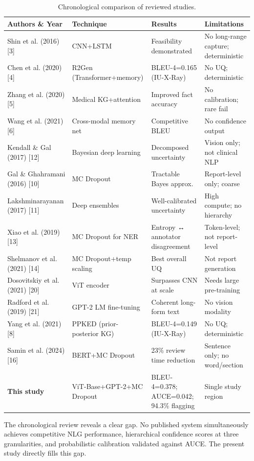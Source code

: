 \documentclass{jcst}
\begin{document}
\begin{table}[htbp]
\centering
\small
\caption{Chronological comparison of reviewed studies.}
\label{tab:lit_review}
\begin{tabular}{p{2.2cm}p{2.0cm}p{2.4cm}p{2.2cm}}
\toprule
\textbf{Authors \& Year} & \textbf{Technique} & \textbf{Results} & \textbf{Limitations} \\
\midrule
Shin et al. (2016) [3] & CNN+LSTM & Feasibility demonstrated & No long-range capture; deterministic \\
Chen et al. (2020) [4] & R2Gen (Transformer+memory) & BLEU-4=0.165 (IU-X-Ray) & No UQ; deterministic \\
Zhang et al. (2020) [5] & Medical KG+attention & Improved fact accuracy & No calibration; rare fail \\
Wang et al. (2021) [6] & Cross-modal memory net & Competitive BLEU & No confidence output \\
Kendall \& Gal (2017) [12] & Bayesian deep learning & Decomposed uncertainty & Vision only; not clinical NLP \\
Gal \& Ghahramani (2016) [10] & MC Dropout & Tractable Bayes approx. & Report-level only; coarse \\
Lakshminarayanan (2017) [11] & Deep ensembles & Well-calibrated uncertainty & High compute; no hierarchy \\
Xiao et al. (2019) [13] & MC Dropout for NER & Entropy ↔ annotator disagreement & Token-level; not report-level \\
Shelmanov et al. (2021) [14] & MC Dropout+temp scaling & Best overall UQ & Not report generation \\
Dosovitskiy et al. (2021) [20] & ViT encoder & Surpasses CNN at scale & Needs large pre-training \\
Radford et al. (2019) [21] & GPT-2 LM fine-tuning & Coherent long-form text & No vision modality \\
Yang et al. (2021) [8] & PPKED (prior-posterior KG) & BLEU-4=0.149 (IU-X-Ray) & No UQ; deterministic \\
Samin et al. (2024) [16] & BERT+MC Dropout & 23\% review time reduction & Sentence only; no word/section \\
\textbf{This study} & ViT-Base+GPT-2+MC Dropout & BLEU-4=0.378; AUCE=0.042; 94.3\% flagging & Single study region \\
\bottomrule
\end{tabular}
\end{table}

The chronological review reveals a clear gap. No published system simultaneously achieves competitive NLG performance, hierarchical confidence scores at three granularities, and probabilistic calibration validated against AUCE. The present study directly fills this gap.
\end{document}
